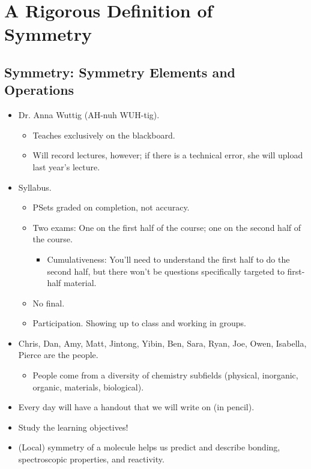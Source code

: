 \documentclass[../notes.tex]{subfiles}
\begin{document}
\chapter{A Rigorous Definition of Symmetry}
\section{Symmetry: Symmetry Elements and Operations}
\begin{itemize}
    \item {}Dr. Anna Wuttig (AH-nuh WUH-tig).
    \begin{itemize}
        \item Teaches exclusively on the blackboard.
        \item Will record lectures, however; if there is a technical error, she will upload last year's lecture.
    \end{itemize}
    \item Syllabus.
    \begin{itemize}
        \item PSets graded on completion, not accuracy.
        \item Two exams: One on the first half of the course; one on the second half of the course.
        \begin{itemize}
            \item Cumulativeness: You'll need to understand the first half to do the second half, but there won't be questions specifically targeted to first-half material.
        \end{itemize}
        \item No final.
        \item Participation. Showing up to class and working in groups.
    \end{itemize}
    \item Chris, Dan, Amy, Matt, Jintong, Yibin, Ben, Sara, Ryan, Joe, Owen, Isabella, Pierce are the people.
    \begin{itemize}
        \item People come from a diversity of chemistry subfields (physical, inorganic, organic, materials, biological).
    \end{itemize}
    \item Every day will have a handout that we will write on (in pencil).
    \item Study the learning objectives!
    \item (Local) symmetry of a molecule helps us predict and describe bonding, spectroscopic properties, and reactivity.

\end{itemize}
\end{document}
